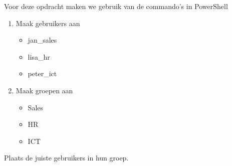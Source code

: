 Voor deze opdracht maken we gebruik van de commando's in PowerShell

\begin{enumerate}
\item Maak gebruikers aan
    \begin{itemize}
    \item jan\_sales
    \item lisa\_hr
    \item peter\_ict
    \end{itemize}
\item Maak groepen aan
    \begin{itemize}
    \item Sales
    \item HR
    \item ICT
    \end{itemize}
\end{enumerate}

Plaats de juiste gebruikers in hun groep.
